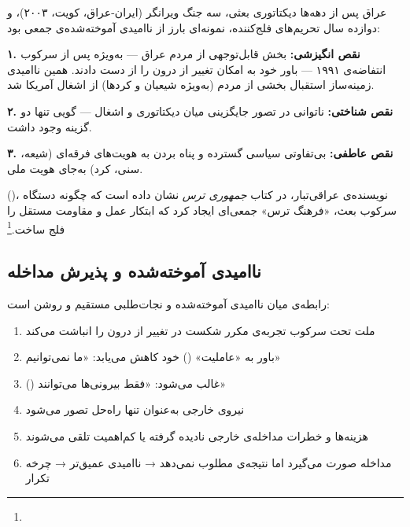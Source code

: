 \begin{tcolorbox}[casebox, title={مطالعه‌ی موردی: ناامیدی آموخته‌شده در عراق}]
عراق پس از دهه‌ها دیکتاتوری بعثی، سه جنگ ویرانگر (ایران-عراق، کویت، ۲۰۰۳)، و دوازده سال تحریم‌های فلج‌کننده، نمونه‌ای بارز از ناامیدی آموخته‌شده‌ی جمعی بود:

\textbf{۱. نقص انگیزشی:} بخش قابل‌توجهی از مردم عراق — به‌ویژه پس از سرکوب انتفاضه‌ی ۱۹۹۱ — باور خود به امکان تغییر از درون را از دست دادند. همین ناامیدی زمینه‌ساز استقبال بخشی از مردم (به‌ویژه شیعیان و کردها) از اشغال آمریکا شد.

\textbf{۲. نقص شناختی:} ناتوانی در تصور جایگزینی میان دیکتاتوری و اشغال — گویی تنها دو گزینه وجود داشت.

\textbf{۳. نقص عاطفی:} بی‌تفاوتی سیاسی گسترده و پناه بردن به هویت‌های فرقه‌ای (شیعه، سنی، کرد) به‌جای هویت ملی.

 ()، نویسنده‌ی عراقی‌تبار، در کتاب \textit{جمهوری ترس} نشان داده است که چگونه دستگاه سرکوب بعث، «فرهنگ ترس» جمعی‌ای ایجاد کرد که ابتکار عمل و مقاومت مستقل را فلج ساخت.\footnote{}
\end{tcolorbox}

\subsection{ناامیدی آموخته‌شده و پذیرش مداخله}
\label{subsec:ch11-helplessness-intervention}

رابطه‌ی میان ناامیدی آموخته‌شده و نجات‌طلبی مستقیم و روشن است:

\begin{tcolorbox}[wavebox, title={مکانیزم: از ناامیدی تا نجات‌طلبی}]
\begin{enumerate}
\item ملت تحت سرکوب تجربه‌ی مکرر شکست در تغییر از درون را انباشت می‌کند
\item باور به «عاملیت» () خود کاهش می‌یابد: «ما نمی‌توانیم»
\item {} () غالب می‌شود: «فقط بیرونی‌ها می‌توانند»
\item نیروی خارجی به‌عنوان تنها راه‌حل تصور می‌شود
\item هزینه‌ها و خطرات مداخله‌ی خارجی نادیده گرفته یا کم‌اهمیت تلقی می‌شوند
\item مداخله صورت می‌گیرد اما نتیجه‌ی مطلوب نمی‌دهد → ناامیدی عمیق‌تر → چرخه تکرار
\end{enumerate}
\end{tcolorbox}


